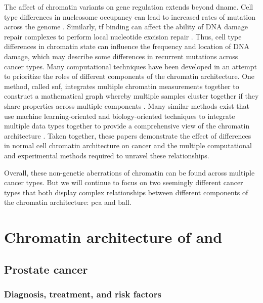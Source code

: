 The affect of chromatin variants on gene regulation extends beyond \gls{dname}.
Cell type differences in nucleosome occupancy can lead to increased rates of mutation across the genome \cite{pichSomaticGermlineMutation2018}.
Similarly, \gls{tf} binding can affect the ability of DNA damage repair complexes to perform local nucleotide excision repair \cite{sabarinathanNucleotideExcisionRepair2016,gonzalez_perezLocalDeterminantsMutational2019}.
Thus, cell type differences in chromatin state can influence the frequency and location of DNA damage, which may describe some differences in recurrent mutations across cancer types.
Many computational techniques have been developed in an attempt to prioritize the roles of different components of the chromatin architecture.
One method, called \gls{snf}, integrates multiple chromatin measurements together to construct a mathematical graph whereby multiple samples cluster together if they share properties across multiple components \cite{wangSimilarityNetworkFusion2014}.
Many similar methods exist that use machine learning-oriented and biology-oriented techniques to integrate multiple data types together to provide a comprehensive view of the chromatin architecture \cite{rappoportMultiomicMultiviewClustering2018}.
Taken together, these papers demonstrate the effect of differences in normal cell chromatin architecture on cancer and the multiple computational and experimental methods required to unravel these relationships.

Overall, these non-genetic aberrations of chromatin can be found across multiple cancer types.
But we will continue to focus on two seemingly different cancer types that both display complex relationships between different components of the chromatin architecture: \gls{pca} and \gls{ball}.

\section{Chromatin architecture of  and }

\subsection{Prostate cancer}

\subsubsection{Diagnosis, treatment, and risk factors}

